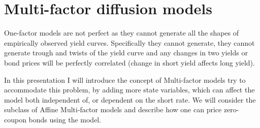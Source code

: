 \chapter{Multi-factor diffusion models}
One-factor models are not perfect as they cannot generate all the shapes of empirically observed
yield curves. Specifically they cannot generate, they cannot generate trough and twists of the yield
curve and any changes in two yields or bond prices will be perfectly correlated (change in short
yield affects long yield).

In this presentation I will introduce the concept of Multi-factor models try to accommodate this
problem, by adding more state variables, which can affect the model both independent of, or
dependent on the short rate. We will consider the subclass of Affine Multi-factor models and
describe how one can price zero-coupon bonds using the model.

